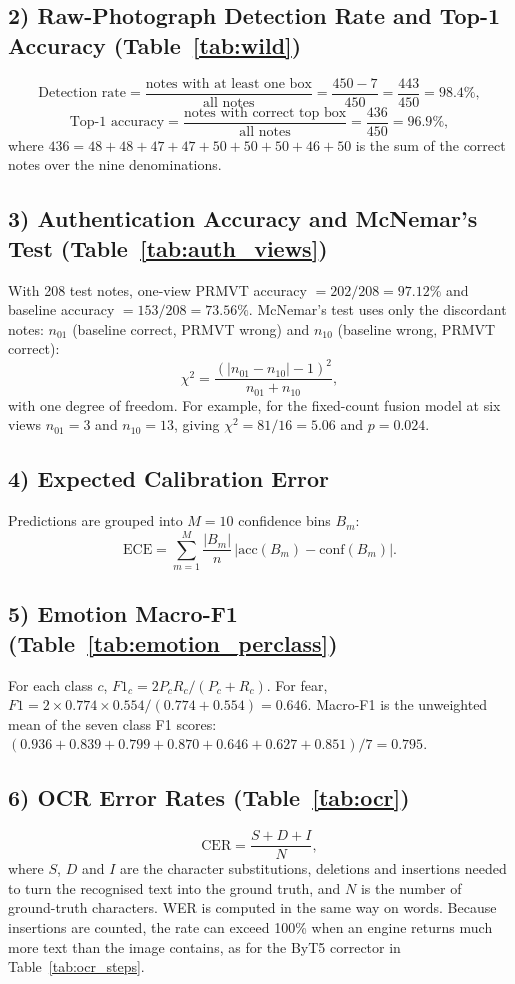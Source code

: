 \subsection*{2) Raw-Photograph Detection Rate and Top-1 Accuracy (Table~\ref{tab:wild})}
\[
\text{Detection rate} = \frac{\text{notes with at least one box}}{\text{all notes}} = \frac{450-7}{450} = \frac{443}{450} = 98.4\%,
\]
\[
\text{Top-1 accuracy} = \frac{\text{notes with correct top box}}{\text{all notes}} = \frac{436}{450} = 96.9\%,
\]
where $436 = 48+48+47+47+50+50+50+46+50$ is the sum of the correct notes over the nine denominations.

\subsection*{3) Authentication Accuracy and McNemar's Test (Table~\ref{tab:auth_views})}
With 208 test notes, one-view PRMVT accuracy $= 202/208 = 97.12\%$ and baseline accuracy $= 153/208 = 73.56\%$. McNemar's test uses only the discordant notes: $n_{01}$ (baseline correct, PRMVT wrong) and $n_{10}$ (baseline wrong, PRMVT correct):
\[
\chi^2 = \frac{(|n_{01}-n_{10}|-1)^2}{n_{01}+n_{10}},
\]
with one degree of freedom. For example, for the fixed-count fusion model at six views $n_{01}=3$ and $n_{10}=13$, giving $\chi^2 = 81/16 = 5.06$ and $p = 0.024$.

\subsection*{4) Expected Calibration Error}
Predictions are grouped into $M = 10$ confidence bins $B_m$:
\[
\text{ECE} = \sum_{m=1}^{M} \frac{|B_m|}{n}\,\bigl|\text{acc}(B_m) - \text{conf}(B_m)\bigr|.
\]

\subsection*{5) Emotion Macro-F1 (Table~\ref{tab:emotion_perclass})}
For each class $c$, $F1_c = 2P_cR_c/(P_c+R_c)$. For fear, $F1 = 2\times0.774\times0.554/(0.774+0.554) = 0.646$. Macro-F1 is the unweighted mean of the seven class F1 scores: $(0.936+0.839+0.799+0.870+0.646+0.627+0.851)/7 = 0.795$.

\subsection*{6) OCR Error Rates (Table~\ref{tab:ocr})}
\[
\text{CER} = \frac{S+D+I}{N},
\]
where $S$, $D$ and $I$ are the character substitutions, deletions and insertions needed to turn the recognised text into the ground truth, and $N$ is the number of ground-truth characters. WER is computed in the same way on words. Because insertions are counted, the rate can exceed 100\% when an engine returns much more text than the image contains, as for the ByT5 corrector in Table~\ref{tab:ocr_steps}.

